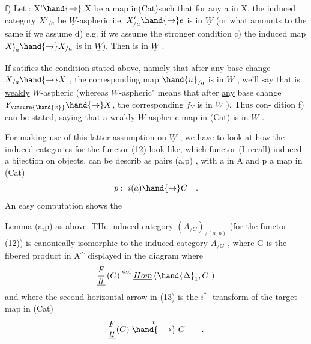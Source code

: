 
f) Let : X'$\hand{\to}$ X be a map in(Cat)such that for any a in X, the
induced category $X'_{/a}$ be $\underline{W}$-aspheric i.e. $X'_{/a}\hand{\to} e$ is in $\underline{W}$
(or what amounts to the same if we assume d) e.g. if we assume
the stronger condition c)\hand{,} the induced map $X'_{/a}\hand{\to} X_{/a}$ is in $\underline{W}$).
Then  is in $\underline{W}$ .

If  satifies the condition stated above, namely that after any base
change $X_{/a}\hand{\to} X$ , the corresponding map $\hand{u}_{/a}$ is in $\underline{W}$ , we'll say that 
is \uline{weakly} $\underline{W}$-aspheric (whereas  $\underline{W}$-aspheric" means that after \uline{any}
base change $Y_{\unsure{\hand{x}}}\hand{\to} X$, the corresponding  $f_Y$ is in $\underline{W}$ ). Thus con-%
dition f) can be stated, saying that \uline{a weakly} $\underline{W}$-\uline{aspheric} \uline{map} \uline{in} (Cat)
\uline{is in} $\underline{W}$ .

For  making use of this latter assumption on $\underline{W}$ , we have to
look at how the induced categories for the functor (12) look like, which
functor (I recall) induced a bijection on objects.  can be describ
as pairs (a,p) , with a in A and p a map in (Cat)
\[ p:\ i(a)\hand{\to} C \quad . \]
An easy computation shows the

\uline{Lemma}  (a,p) as above. THe induced category $({A}_{/C})_{/(a,p)}$ (for
the functor (12)) is canonically isomorphic to the induced category
$A_{/G}$ , where G is the fibered product in A\^{} displayed in the diagram
where
\[ \underline{F\over{l}{l}}\,(C) \overset{\text{def}}{=} \underline{Hom}\,(\hand{\Delta}_1,C\ ) \]
and where the second horizontal arrow in (13) is the $i^{*}$ -transform of the
target map in (Cat)
\[ \underline{F\over{l}{l}}(C) \mathrel{\overset{\ t\ }{\hand{\longrightarrow}}} C \qquad . \]

